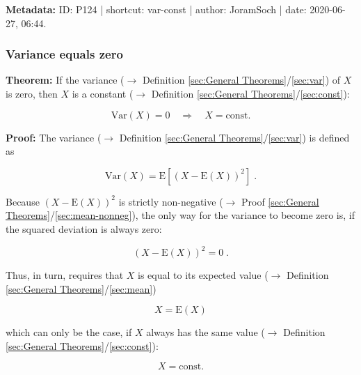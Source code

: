 \documentclass[a4paper,12pt,twoside]{book}
\begin{document}
\vspace{1em}
\textbf{Metadata:} ID: P124 | shortcut: var-const | author: JoramSoch | date: 2020-06-27, 06:44.
\vspace{1em}



\subsubsection[\textbf{Variance equals zero}]{Variance equals zero} \label{sec:var-zero}
\setcounter{equation}{0}

\textbf{Theorem:} If the variance ($\rightarrow$ Definition \ref{sec:General Theorems}/\ref{sec:var}) of $X$ is zero, then $X$ is a constant ($\rightarrow$ Definition \ref{sec:General Theorems}/\ref{sec:const}):

\begin{equation} \label{eq:var-zero-var-zero}
\mathrm{Var}(X) = 0 \quad \Rightarrow \quad X = \text{const.}
\end{equation}


\vspace{1em}
\textbf{Proof:} The variance ($\rightarrow$ Definition \ref{sec:General Theorems}/\ref{sec:var}) is defined as

\begin{equation} \label{eq:var-zero-var}
\mathrm{Var}(X) = \mathrm{E}\left[ (X-\mathrm{E}(X))^2 \right] \; .
\end{equation}

Because $(X-\mathrm{E}(X))^2$ is strictly non-negative ($\rightarrow$ Proof \ref{sec:General Theorems}/\ref{sec:mean-nonneg}), the only way for the variance to become zero is, if the squared deviation is always zero:

\begin{equation} \label{eq:var-zero-sqr-dev-zero}
(X-\mathrm{E}(X))^2 = 0 \; .
\end{equation}

Thus, in turn, requires that $X$ is equal to its expected value ($\rightarrow$ Definition \ref{sec:General Theorems}/\ref{sec:mean})

\begin{equation} \label{eq:var-zero-X-eq-E-X}
X = \mathrm{E}(X)
\end{equation}

which can only be the case, if $X$ always has the same value ($\rightarrow$ Definition \ref{sec:General Theorems}/\ref{sec:const}):

\begin{equation} \label{eq:var-zero-X-const}
X = \text{const.}
\end{equation}
\end{document}

